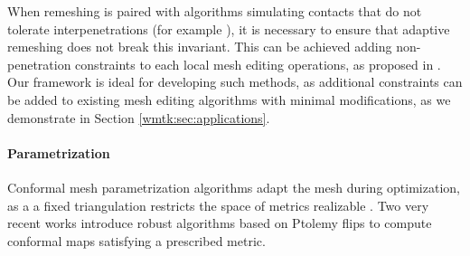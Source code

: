When remeshing is paired with algorithms simulating contacts that do not tolerate interpenetrations (for example \cite{Li2020IPC}), it is necessary to ensure that adaptive remeshing does not break this invariant. This can be achieved adding non-penetration constraints to each local mesh editing operations, as proposed in \cite{Brochu:2012}. Our framework is ideal for developing such methods, as additional constraints can be added to existing mesh editing algorithms with minimal modifications, as we demonstrate in Section \ref{wmtk:sec:applications}.








\paragraph{Parametrization} 

Conformal mesh parametrization algorithms adapt the mesh during optimization, as a a fixed triangulation restricts the space of metrics realizable \cite{luo2004combinatorial,Campen:2017:SimilarityMaps,Campen:2017:OnSimilarityMaps,campen2018seamless,gu2018discrete,gu2018discrete2,springborn2019ideal,sun2015discrete}. Two very recent works \cite{Gillespie:2021:DCE,Campen:2021} introduce robust algorithms based on Ptolemy flips to compute conformal maps satisfying a prescribed metric.

